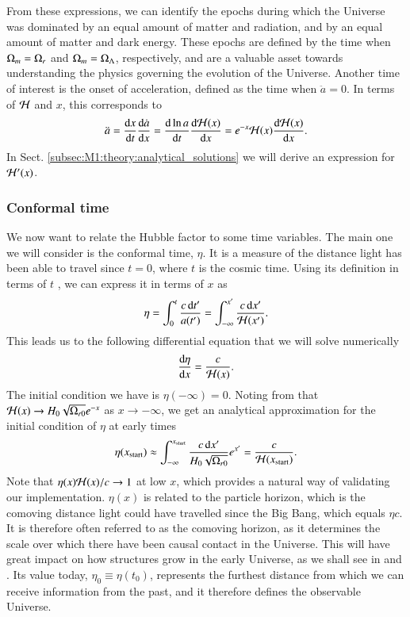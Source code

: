 From these expressions, we can identify the epochs during which the Universe was dominated by an equal amount of matter and radiation, and by an equal amount of matter and dark energy. These epochs are defined by the time when $\Omega_{m}=\Omega_{r}$ and $\Omega_{m}=\Omega_{\Lambda}$, respectively, and are a valuable asset towards understanding the physics governing the evolution of the Universe. Another time of interest is the onset of acceleration, defined as the time when $\ddot{a}=0$. In terms of $\mathcal{H}$ and $x$, this corresponds to 
\begin{equation}
    \ddot{a} = \dv{x}{t}\dv{\dot{a}}{x}=\dv{\ln a}{t}\dv{\mathcal{H}(x)}{x} = e^{-x} \mathcal{H}(x) \dv{\mathcal{H}(x)}{x}. \label{eq:M1:theory:acceleration_onset}
\end{equation}   
In Sect. \ref{subsec:M1:theory:analytical_solutions} we will derive an expression for $\mathcal{H}'(x)$. 

\subsubsection{Conformal time} \label{sssec:M1:theory:conformal_time}
We now want to relate the Hubble factor to some time variables. The main one we will consider is the conformal time, $\eta$. It is a measure of the distance light has been able to travel since $t=0$, where $t$ is the cosmic time. Using its definition in terms of $t$ \cite[Eq. (2.90)]{Dodelson}, we can express it in terms of $x$ as 
\begin{equation}
    \eta = \int_0^t \frac{c \, \dd t'}{a(t')} = \int_{-\infty}^{x'} \frac{c\,\dd x'}{\mathcal{H}(x')}. \label{eq:M1:theory:eta_of_x_integral_expression}
\end{equation}
%
This leads us to the following differential equation that we will solve numerically 
\begin{equation}
    \dv{\eta}{x} = \frac{c}{\mathcal{H}(x)}. \label{eq:M1:theory:eta_ODE}
\end{equation}
%
The initial condition we have is $\eta(-\infty)=0$. Noting from  that $\mathcal{H}(x)\to H_0\sqrt{\Omega_{r0}}e^{-x}$ as $x\to-\infty$, we get an analytical approximation for the initial condition of $\eta$ at early times 
\begin{align}
    \eta(x_\mathrm{start}) \approx \int_{-\infty}^{x_\mathrm{start}} \frac{c\,\dd x'}{H_0\sqrt{\Omega_{r0}}} e^{x'} = \frac{c}{\mathcal{H}(x_\mathrm{start})}. \label{eq:M1:theory:eta_of_xstart_analytical_approximation}
\end{align} 
%
Note that $\eta(x)\mathcal{H}(x)/c\to 1$ at low $x$, which provides a natural way of validating our implementation. $\eta(x)$ is related to the particle horizon, which is the comoving distance light could have travelled since the Big Bang, which equals $\eta c$. It is therefore often referred to as the comoving horizon, as it determines the scale over which there have been causal contact in the Universe. This will have great impact on how structures grow in the early Universe, as we shall see in  and . Its value today, $\eta_0\equiv\eta(t_0)$, represents the furthest distance from which we can receive information from the past, and it therefore defines the observable Universe.     

